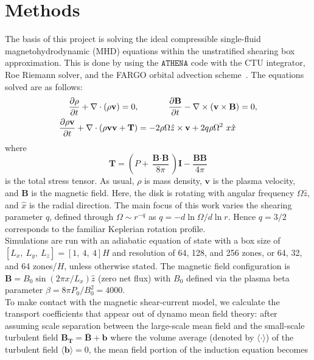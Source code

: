 \documentclass{epsconf}
\newcommand{\bb}[1]{\textbf{#1}}
\begin{document}
\section{Methods} \label{sec:methods}
The basis of this project is solving the ideal compressible single-fluid magnetohydrodynamic (MHD) equations within the unstratified shearing box approximation. This is done by using the $\texttt{ATHENA}$ code with the CTU integrator, Roe Riemann solver, and the FARGO orbital advection scheme~\cite{StoneGardiner2010}. The equations solved are as follows:
\begin{align}
    \frac{\partial\rho}{\partial t}+\nabla\cdot(\rho\bb{v})=0, &\hspace{.5in}  \frac{\partial\bb{B}}{\partial t} - \nabla\times(\bb{v}\times\bb{B})=0, \\
    \frac{\partial\rho\bb{v}}{\partial t} + \nabla\cdot(\rho\bb{vv}+\bb{T})&= -2\rho\Omega\hat z\times\bb{v}+2q\rho\Omega^2~x\hat x
\end{align}
where 
\begin{equation*}
    \bb{T} = \left(P+\frac{\bb{B}\cdot\bb{B}}{8\pi}\right)\bb{I}-\frac{\bb{BB}}{4\pi}
\end{equation*}
is the total stress tensor. As usual, $\rho$ is mass density, $\bb{v}$ is the plasma velocity, and $\bb{B}$ is the magnetic field. Here, the disk is rotating with angular frequency $\Omega\hat z$, and $\hat x$ is the radial direction. The main focus of this work varies the shearing parameter $q$, defined through $\Omega\sim r^{-q}$ as $q=-d\ln\Omega/d\ln r$. Hence $q=3/2$ corresponds to the familiar Keplerian rotation profile.\\
%
Simulations are run with an adiabatic equation of state with a box size of $[L_x,~L_y,~L_z] = [1,~4,~4] H$ and resolution of 64, 128, and 256 zones, or 64, 32, and 64 zones/$H$, unless otherwise stated. The magnetic field configuration is $\bb{B}=B_0\sin(2\pi x/L_x)\hat z$ (zero net flux) with $B_0$ defined via the plasma beta parameter $\beta = 8\pi P_0/B_0^2 = 4000$. \\
%
To make contact with the magnetic shear-current model, we calculate the transport coefficients that appear out of dynamo mean field theory: after assuming scale separation between the large-scale mean field and the small-scale turbulent field $\mathbf{B_T}=\bar{\bb{B}}+\bb{b}$ where the volume average (denoted by $\langle\cdot\rangle$) of the turbulent field $\langle\bb{b}\rangle=0$, the mean field portion of the induction equation becomes
\end{document}
